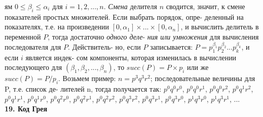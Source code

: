 \noindent
ям $0\leqslant \beta_i\leqslant \alpha_i$ для $i=1,2,...,n$. \textit{Смена} делителя $n$ сводится, значит, к\linebreak
смене показателей простых множителей. Если выбрать порядок, опре-\linebreak
деленный на показателях, т.е. на произведении $[0,\alpha_1]\times...\times[0,\alpha_n]$, и\linebreak
вычислить делитель в переменной $P$, тогда достаточно \textit{одного деле}-\linebreak
\textit{ния или умножения} для вычисления последователя для $P$. Действитель-\linebreak
но, если $P$ записывается: $P=p_1^{\beta_1}p_2^{\beta_2}...p_k^{\beta_k}$, и если $i$ является индек-\linebreak
сом компоненты, которая изменилась в вычислении последующего для\linebreak
$(\beta_1,\beta_2,...,\beta_n)$, то $succ(P)=P\times p_i$  или же $succ(P)=P/p_i$. Возьмем\linebreak
пример: $n=p^3q^3r^2$; последовательные величины для P, т.е. список де-\linebreak
лителей n, тогда получается так: $p^0q^0r^0$, $p^0q^0r^1$, $p^0q^0r^2$, $p^0q^1r^2$, $p^0q^1r^1$,\linebreak
$p^0q^1r^0$, $p^0q^2r^0$, $p^0q^2r^1$, $p^0q^2r^2$, $p^0q^3r^2$, $p^0q^3r^1$, $p^0q^3r^0$, $p^1q^3r^0$, $p^1q^3r^1$,\linebreak
...\\

\noindent\textbf{19. Код Грея}\\

